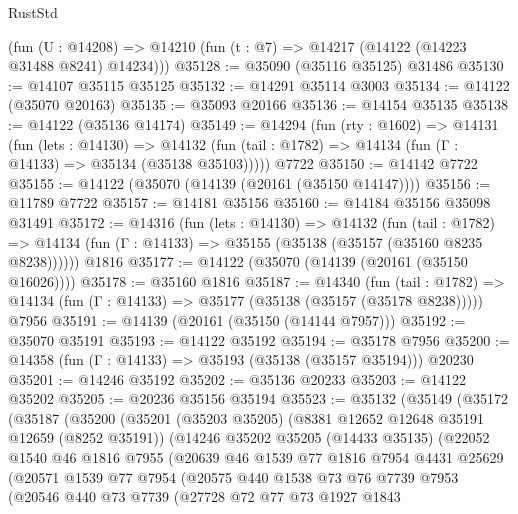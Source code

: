 \begin{lexlean}{RustStd}
\begin{coremodule}
    (fun (U : @14208) => @14210 (fun (t : @7) => @14217 (@14122 (@14223 @31488 @8241) @14234)))
@35128 := @35090 (@35116 @35125) @31486
@35130 := @14107 @35115 @35125
@35132 := @14291 @35114 @3003
@35134 := @14122 (@35070 @20163)
@35135 := @35093 @20166
@35136 := @14154 @35135
@35138 := @14122 (@35136 @14174)
@35149 := @14294
    (fun (rty : @1602) =>
    @14131
      (fun (lets : @14130) =>
      @14132 (fun (tail : @1782) => @14134 (fun (Γ : @14133) => @35134 (@35138 @35103)))))
    @7722
@35150 := @14142 @7722
@35155 := @14122 (@35070 (@14139 (@20161 (@35150 @14147))))
@35156 := @11789 @7722
@35157 := @14181 @35156
@35160 := @14184 @35156 @35098 @31491
@35172 := @14316
    (fun (lets : @14130) =>
    @14132
      (fun (tail : @1782) =>
      @14134 (fun (Γ : @14133) => @35155 (@35138 (@35157 (@35160 @8235 @8238))))))
    @1816
@35177 := @14122 (@35070 (@14139 (@20161 (@35150 @16026))))
@35178 := @35160 @1816
@35187 := @14340
    (fun (tail : @1782) => @14134 (fun (Γ : @14133) => @35177 (@35138 (@35157 (@35178 @8238)))))
    @7956
@35191 := @14139 (@20161 (@35150 (@14144 @7957)))
@35192 := @35070 @35191
@35193 := @14122 @35192
@35194 := @35178 @7956
@35200 := @14358 (fun (Γ : @14133) => @35193 (@35138 (@35157 @35194))) @20230
@35201 := @14246 @35192
@35202 := @35136 @20233
@35203 := @14122 @35202
@35205 := @20236 @35156 @35194
@35523 := @35132
    (@35149
      (@35172
        (@35187
          (@35200
            (@35201
              (@35203 @35205)
              (@8381 @12652 @12648 @35191 @12659 (@8252 @35191))
              (@14246
                @35202
                @35205
                (@14433 @35135)
                (@22052
                  @1540
                  @46
                  @1816
                  @7955
                  (@20639
                    @46
                    @1539
                    @77
                    @1816
                    @7954
                    @4431
                    @25629
                    (@20571
                      @1539
                      @77
                      @7954
                      (@20575
                        @440
                        @1538
                        @73
                        @76
                        @7739
                        @7953
                        (@20546
                          @440
                          @73
                          @7739
                          (@27728
                            @72
                            @77
                            @73
                            @1927
                            @1843

\end{coremodule}
\end{lexlean}

